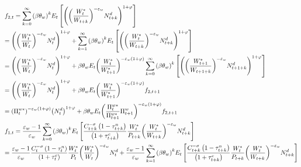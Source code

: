 \documentclass[12pt,a4paper]{article}
\begin{document}
\[\begin{gathered}
  {f_{2,t}} = \sum\limits_{k = 0}^\infty  {{{\left( {\beta {\theta _w}} \right)}^k}} {E_t}\left[ {{{\left( {{{\left( {\frac{{W_t^*}}{{{W_{t + k}}}}} \right)}^{ - {\varepsilon _w}}}N_{t + k}^d} \right)}^{1 + \varphi }}} \right] \hfill \\
   = {\left( {{{\left( {\frac{{W_t^*}}{{{W_t}}}} \right)}^{ - {\varepsilon _w}}}N_t^d} \right)^{1 + \varphi }} + \sum\limits_{k = 1}^\infty  {{{\left( {\beta {\theta _w}} \right)}^k}} {E_t}\left[ {{{\left( {{{\left( {\frac{{W_t^*}}{{{W_{t + k}}}}} \right)}^{ - {\varepsilon _w}}}N_{t + k}^d} \right)}^{1 + \varphi }}} \right] \hfill \\
   = {\left( {{{\left( {\frac{{W_t^*}}{{{W_t}}}} \right)}^{ - {\varepsilon _w}}}N_t^d} \right)^{1 + \varphi }} + \beta {\theta _w}{E_t}{\left( {\frac{{W_t^*}}{{W_{t + 1}^*}}} \right)^{ - {\varepsilon _w}\left( {1 + \varphi } \right)}}\sum\limits_{k = 0}^\infty  {{{\left( {\beta {\theta _w}} \right)}^k}} \left[ {{{\left( {{{\left( {\frac{{W_{t + 1}^*}}{{{W_{t + 1 + k}}}}} \right)}^{ - {\varepsilon _w}}}N_{t + 1 + k}^d} \right)}^{1 + \varphi }}} \right] \hfill \\
   = {\left( {{{\left( {\frac{{W_t^*}}{{{W_t}}}} \right)}^{ - {\varepsilon _w}}}N_t^d} \right)^{1 + \varphi }} + \beta {\theta _w}{E_t}{\left( {\frac{{W_t^*}}{{W_{t + 1}^*}}} \right)^{ - {\varepsilon _w}\left( {1 + \varphi } \right)}}{f_{2,t + 1}} \hfill \\
   ={\left( {\Pi _t^{w*}} \right)^{ - {\varepsilon _w}\left( {1 + \varphi } \right)}}{\left( {N_t^d} \right)^{1 + \varphi }} + \beta {\theta _w}{E_t}{\left( {\frac{{\Pi _t^{w*}}}{{\Pi _{t + 1}^{w*}}}\Pi _{t + 1}^w} \right)^{ - {\varepsilon _w}\left( {1 + \varphi } \right)}}{f_{2,t + 1}}\hfill\\
  {f_{1,t}} = \frac{{{\varepsilon _w} - 1}}{{{\varepsilon _w}}}\sum\limits_{k = 0}^\infty  {{{\left( {\beta {\theta _w}} \right)}^k}} {E_t}\left[ {\frac{{C_{t + k}^{ - \sigma }\left( {1 - \tau _{t + k}^n} \right)}}{{\left( {1 + \tau _{t + k}^c} \right)}}\frac{{W_t^*}}{{{P_{t + k}}}}{{\left( {\frac{{W_t^*}}{{{W_{t + k}}}}} \right)}^{ - {\varepsilon _w}}}N_{t + k}^d} \right] \hfill \\
   = \frac{{{\varepsilon _w} - 1}}{{{\varepsilon _w}}}\frac{{C_t^{ - \sigma }\left( {1 - \tau _t^n} \right)}}{{\left( {1 + \tau _t^c} \right)}}\frac{{W_t^*}}{{{P_t}}}{\left( {\frac{{W_t^*}}{{{W_t}}}} \right)^{ - {\varepsilon _w}}}N_t^d + \frac{{{\varepsilon _w} - 1}}{{{\varepsilon _w}}}\sum\limits_{k = 1}^\infty  {{{\left( {\beta {\theta _w}} \right)}^k}} {E_t}\left[ {\frac{{C_{t + k}^{ - \sigma }\left( {1 - \tau _{t + k}^n} \right)}}{{\left( {1 + \tau _{t + k}^c} \right)}}\frac{{W_t^*}}{{{P_{t + k}}}}{{\left( {\frac{{W_t^*}}{{{W_{t + k}}}}} \right)}^{ - {\varepsilon _w}}}N_{t + k}^d} \right] \hfill \\

\end{gathered}\]
\end{document}
